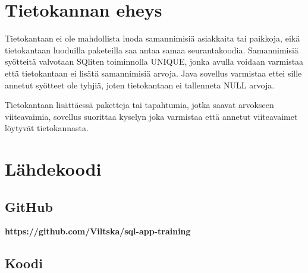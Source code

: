 \documentclass[12pt,a4paper]{article}
\begin{document}
\newpage
\section{Tietokannan eheys}
Tietokantaan ei ole mahdollista luoda samannimisiä asiakkaita tai paikkoja, eikä tietokantaan luoduilla paketeilla saa antaa samaa seurantakoodia. Samannimisiä syötteitä valvotaan SQliten toiminnolla UNIQUE, jonka avulla voidaan varmistaa että tietokantaan ei lisätä samannimisiä arvoja. Java sovellus varmistaa ettei sille annetut syötteet ole tyhjiä, joten tietokantaan ei tallenneta NULL arvoja.

Tietokantaan lisättäessä paketteja tai tapahtumia, jotka saavat arvokseen viiteavaimia, sovellus suorittaa kyselyn joka varmistaa että annetut viiteavaimet löytyvät tietokannasta.





\newpage
\section{Lähdekoodi}
\subsection*{GitHub}
\textbf{https://github.com/Viltska/sql-app-training}
\subsection*{Koodi}


\newpage
\end{document}
